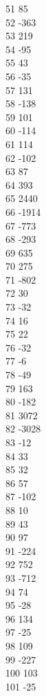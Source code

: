 { 51	85 \\
 52	-363 \\
 53	219 \\
 54	-95 \\
 55	43 \\
 56	-35 \\
 57	131 \\
 58	-138 \\
 59	101 \\
 60	-114 \\
 61	114 \\
 62	-102 \\
 63	87 \\
 64	393 \\
 65	2440 \\
 66	-1914 \\
 67	-773 \\
 68	-293 \\
 69	635 \\
 70	275 \\
 71	-802 \\
 72	30 \\
 73	-32 \\
 74	16 \\
 75	22 \\
 76	-32 \\
 77	-6 \\
 78	-49 \\
 79	163 \\
 80	-182 \\
 81	3072 \\
 82	-3028 \\
 83	-12 \\
 84	33 \\
 85	32 \\
 86	57 \\
 87	-102 \\
 88	10 \\
 89	43 \\
 90	97 \\
 91	-224 \\
 92	752 \\
 93	-712 \\
 94	74 \\
 95	-28 \\
 96	134 \\
 97	-25 \\
 98	109 \\
 99	-227 \\
 100	103 \\
 101	-25 \\
}
